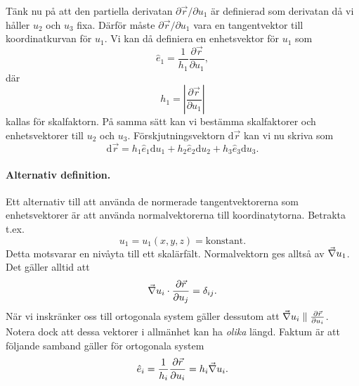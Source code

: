 \documentclass[%
oneside,                 %
final,                   %
10pt]{article}
\begin{document}
Tänk nu på att den partiella derivatan $\partial \vec{r}/\partial u_1$
är definierad som derivatan då vi håller $u_2$ och $u_3$ fixa.
Därför måste $\partial \vec{r}/\partial u_1$ vara en tangentvektor
till koordinatkurvan för $u_1$.  Vi kan då definiera en enhetsvektor 
för $u_1$ som
\begin{equation}
  \hat{e}_1 = \frac{1}{h_1} \frac{\partial \vec{r}}{\partial u_1},
\end{equation}
där 
\begin{equation}
  h_1 = \left|\frac{\partial \vec{r}}{\partial u_1}\right|
\end{equation}
kallas för skalfaktorn.  På samma sätt kan vi bestämma skalfaktorer och enhetsvektorer till $u_2$ och $u_3$. Förskjutningsvektorn $\mbox{d}\vec{r}$ kan vi nu skriva som
\begin{equation}
  \mbox{d}\vec{r} = h_1\hat{e}_1 \mbox{d}u_1 + h_2\hat{e}_2\mbox{d}u_2 +
h_3\hat{e}_3\mbox{d}u_3.
\label{eq:forskjutningsvektor_skalfaktor}
\end{equation}

\paragraph{Alternativ definition.}
Ett alternativ till att använda de normerade tangentvektorerna som enhetsvektorer är att använda normalvektorerna till koordinatytorna. Betrakta t.ex.
\begin{equation}
u_1 = u_1(x,y,z) = \mathrm{konstant}.
\end{equation}
Detta motsvarar en nivåyta till ett skalärfält. Normalvektorn ges alltså av $\vec{\nabla} u_1$.
Det gäller alltid att 
\begin{equation}
\vec{\nabla} u_i \cdot \frac{\partial \vec{r}}{\partial u_j} = \delta_{ij}.
\end{equation}
När vi inskränker oss till ortogonala system gäller dessutom att $\vec{\nabla} u_i \parallel \frac{\partial \vec{r}}{\partial u_i}$. Notera dock att dessa vektorer i allmänhet kan ha \emph{olika} längd. Faktum är att följande samband gäller för ortogonala system
\begin{equation}
\hat{e}_i 
= \frac{1}{h_i} \frac{\partial \vec{r}}{\partial u_i}
= h_i \vec{\nabla} u_i.
\end{equation}
\end{document}

